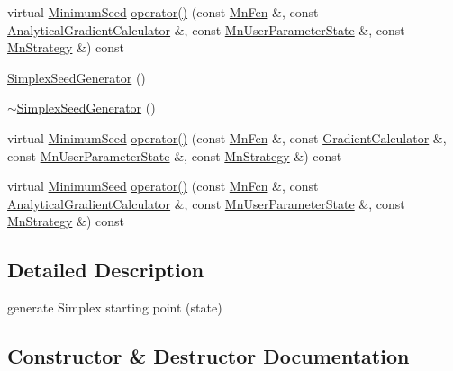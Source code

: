 \begin{DoxyCompactItemize}
\item 
virtual \mbox{\hyperlink{classROOT_1_1Minuit2_1_1MinimumSeed}{Minimum\+Seed}} \mbox{\hyperlink{classROOT_1_1Minuit2_1_1SimplexSeedGenerator_a483dc9272be849a23bcd0d29ac4e3b94}{operator()}} (const \mbox{\hyperlink{classROOT_1_1Minuit2_1_1MnFcn}{Mn\+Fcn}} \&, const \mbox{\hyperlink{classROOT_1_1Minuit2_1_1AnalyticalGradientCalculator}{Analytical\+Gradient\+Calculator}} \&, const \mbox{\hyperlink{classROOT_1_1Minuit2_1_1MnUserParameterState}{Mn\+User\+Parameter\+State}} \&, const \mbox{\hyperlink{classROOT_1_1Minuit2_1_1MnStrategy}{Mn\+Strategy}} \&) const
\item 
\mbox{\hyperlink{classROOT_1_1Minuit2_1_1SimplexSeedGenerator_a87fe66f9acb29b55da8d457cd761b1af}{Simplex\+Seed\+Generator}} ()
\item 
\mbox{\hyperlink{classROOT_1_1Minuit2_1_1SimplexSeedGenerator_a2b791925969c5bfb1f427b978a277e25}{$\sim$\+Simplex\+Seed\+Generator}} ()
\item 
virtual \mbox{\hyperlink{classROOT_1_1Minuit2_1_1MinimumSeed}{Minimum\+Seed}} \mbox{\hyperlink{classROOT_1_1Minuit2_1_1SimplexSeedGenerator_a48f1bb260753e6c6f053072d4754a028}{operator()}} (const \mbox{\hyperlink{classROOT_1_1Minuit2_1_1MnFcn}{Mn\+Fcn}} \&, const \mbox{\hyperlink{classROOT_1_1Minuit2_1_1GradientCalculator}{Gradient\+Calculator}} \&, const \mbox{\hyperlink{classROOT_1_1Minuit2_1_1MnUserParameterState}{Mn\+User\+Parameter\+State}} \&, const \mbox{\hyperlink{classROOT_1_1Minuit2_1_1MnStrategy}{Mn\+Strategy}} \&) const
\item 
virtual \mbox{\hyperlink{classROOT_1_1Minuit2_1_1MinimumSeed}{Minimum\+Seed}} \mbox{\hyperlink{classROOT_1_1Minuit2_1_1SimplexSeedGenerator_a483dc9272be849a23bcd0d29ac4e3b94}{operator()}} (const \mbox{\hyperlink{classROOT_1_1Minuit2_1_1MnFcn}{Mn\+Fcn}} \&, const \mbox{\hyperlink{classROOT_1_1Minuit2_1_1AnalyticalGradientCalculator}{Analytical\+Gradient\+Calculator}} \&, const \mbox{\hyperlink{classROOT_1_1Minuit2_1_1MnUserParameterState}{Mn\+User\+Parameter\+State}} \&, const \mbox{\hyperlink{classROOT_1_1Minuit2_1_1MnStrategy}{Mn\+Strategy}} \&) const
\end{DoxyCompactItemize}


\subsection{Detailed Description}
generate Simplex starting point (state) 

\subsection{Constructor \& Destructor Documentation}
\mbox{\label{classROOT_1_1Minuit2_1_1SimplexSeedGenerator_a87fe66f9acb29b55da8d457cd761b1af}} 
